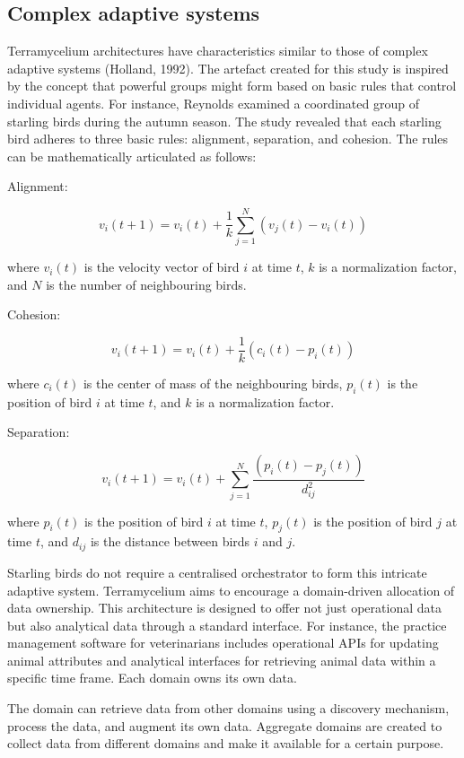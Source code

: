 \documentclass[review]{elsarticle}
\begin{document}
\subsection{Complex adaptive systems}

Terramycelium architectures have characteristics similar to those of complex adaptive systems (Holland, 1992). The artefact created for this study is inspired by the concept that powerful groups might form based on basic rules that control individual agents. For instance, Reynolds \cite{reynolds1987flocks} examined a coordinated group of starling birds during the autumn season. The study revealed that each starling bird adheres to three basic rules: alignment, separation, and cohesion. The rules can be mathematically articulated as follows:

Alignment:

$$ v_i(t+1) = v_i(t) + \frac{1}{k} \sum_{j=1}^{N} (v_j(t) - v_i(t)) $$

where $v_i(t)$ is the velocity vector of bird $i$ at time $t$, $k$ is a normalization factor, and $N$ is the number of neighbouring birds.

Cohesion:

$$ v_i(t+1) = v_i(t) + \frac{1}{k} (c_i(t) - p_i(t)) $$

where $c_i(t)$ is the center of mass of the neighbouring birds, $p_i(t)$ is the position of bird $i$ at time $t$, and $k$ is a normalization factor.

Separation:

$$ v_i(t+1) = v_i(t) + \sum_{j=1}^{N} \frac{(p_i(t) - p_j(t))}{d_{ij}^2} $$

where $p_i(t)$ is the position of bird $i$ at time $t$, $p_j(t)$ is the position of bird $j$ at time $t$, and $d_{ij}$ is the distance between birds $i$ and $j$.

Starling birds do not require a centralised orchestrator to form this intricate adaptive system. Terramycelium aims to encourage a domain-driven allocation of data ownership. This architecture is designed to offer not just operational data but also analytical data through a standard interface. For instance, the practice management software for veterinarians includes operational APIs for updating animal attributes and analytical interfaces for retrieving animal data within a specific time frame. Each domain owns its own data.

The domain can retrieve data from other domains using a discovery mechanism, process the data, and augment its own data. Aggregate domains are created to collect data from different domains and make it available for a certain purpose. 
\end{document}
